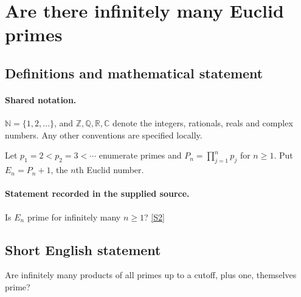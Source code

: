 \documentclass[11pt]{article}
\newcommand{\sref}[2]{\hyperlink{source:#1:#2}{[S#2]}}
\begin{document}
\section{Are there infinitely many Euclid primes}\label{statement}

\subsection{Definitions and mathematical statement}

\paragraph{Shared notation.}$\mathbb N=\{1,2,\ldots\}$, and $\mathbb Z,\mathbb Q,\mathbb R,\mathbb C$ denote the integers, rationals, reals and complex numbers. Any other conventions are specified locally.


Let $p_1=2<p_2=3<\cdots$ enumerate primes and $P_n=\prod_{j=1}^{n}p_j$ for $n\ge1$. Put $E_n=P_n+1$, the $n$th Euclid number.
\paragraph{Statement recorded in the supplied source.}
Is $E_n$ prime for infinitely many $n\ge1$? \sref{statement}{2}
\subsection{Short English statement}
Are infinitely many products of all primes up to a cutoff, plus one, themselves prime?
\end{document}
